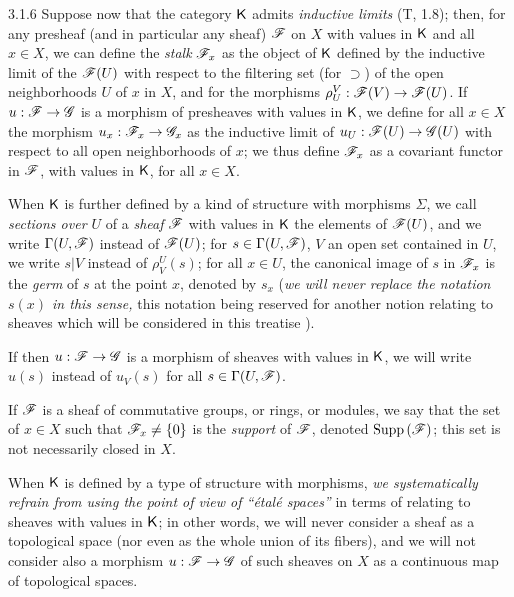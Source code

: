\begin{env}{3.1.6}
\label{env-0.3.1.6}
Suppose now that the category $\mathsf{K}$ admits \emph{inductive limits} (T, 1.8); then, for any
presheaf (and in particular any sheaf) $\mathscr{F}$ on $X$ with values in $\mathsf{K}$ and all $x\in X$,
we can define the \emph{stalk} $\mathscr{F}_x$ as the object of $\mathsf{K}$ defined by the inductive
limit of the $\mathscr{F}(U)$ with respect to the filtering set (for $\supset$) of the open
neighborhoods $U$ of $x$ in $X$, and for the morphisms $\rho_U^V:\mathscr{F}(V)\to\mathscr{F}(U)$. If
$u:\mathscr{F}\to\mathscr{G}$ is a morphism of presheaves with values in $\mathsf{K}$, we define for all
$x\in X$ the morphism $u_x:\mathscr{F}_x\to\mathscr{G}_x$ as the inductive limit of
$u_U:\mathscr{F}(U)\to\mathscr{G}(U)$ with respect to all open neighborhoods of $x$; we thus define
$\mathscr{F}_x$ as a covariant functor in $\mathscr{F}$, with values in $\mathsf{K}$, for all $x\in X$.

When $\mathsf{K}$ is further defined by a kind of structure with morphisms $\Sigma$, we call
\emph{sections over $U$} of a \emph{sheaf} $\mathscr{F}$ with values in $\mathsf{K}$ the elements of
$\mathscr{F}(U)$, and we write $\Gamma(U,\mathscr{F})$ instead of $\mathscr{F}(U)$; for
$s\in\Gamma(U,\mathscr{F})$, $V$ an open set contained in $U$, we write $s|V$ instead of
$\rho_V^U(s)$; for all $x\in U$, the canonical image of $s$ in $\mathscr{F}_x$ is the \emph{germ}
of $s$ at the point $x$, denoted by $s_x$ (\emph{we will never replace the notation $s(x)$ in
this sense,} this notation being reserved for another notion relating to sheaves which will
be considered in this treatise ).

If then $u:\mathscr{F}\to\mathscr{G}$ is a morphism of sheaves with values in $\mathsf{K}$, we will write
$u(s)$ instead of $u_V(s)$ for all $s\in\Gamma(U,\mathscr{F})$.

If $\mathscr{F}$ is a sheaf of commutative groups, or rings, or modules, we say that the set of
$x\in X$ such that $\mathscr{F}_x\neq\{0\}$ is the \emph{support} of $\mathscr{F}$, denoted
${\mathop{\mathrm{Supp}}\nolimits}\,(\mathscr{F})$; this set is not necessarily closed in $X$.

When $\mathsf{K}$ is defined by a type of structure with morphisms, \emph{we systematically refrain
from using the point of view of ``\'etal\'e spaces''} in terms of relating to sheaves with
values in $\mathsf{K}$; in other words, we will never consider a sheaf as a topological space (nor
even as the whole union of its fibers), and we will not consider also a morphism
$u:\mathscr{F}\to\mathscr{G}$ of such sheaves on $X$ as a continuous map of topological spaces.
\end{env}

